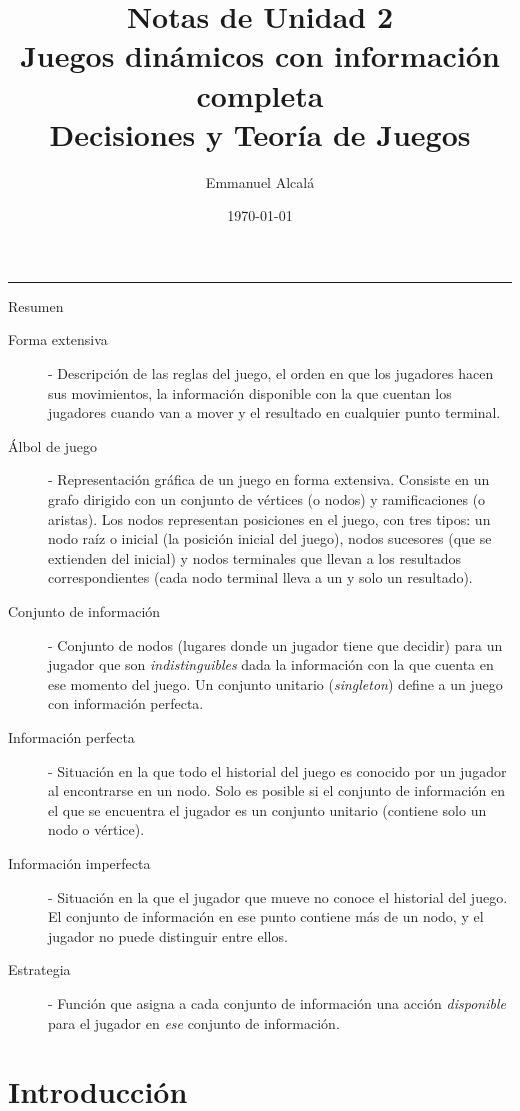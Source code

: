 \documentclass[12pt]{scrartcl}
\title{Notas de Unidad 2\\ \textbf{Juegos dinámicos con información completa}\\ \normalsize Decisiones y Teoría de Juegos}
\author{Emmanuel Alcalá}
\date{\today}
\begin{document}
	
\maketitle

\hrule

\begin{summarybox}{Resumen}
	\begin{description}
		\item[Forma extensiva] - Descripción de las reglas del juego, el orden en que los jugadores hacen sus movimientos, la información disponible con la que cuentan los jugadores cuando van a mover y el resultado en cualquier punto terminal.
		\item[Álbol de juego] - Representación gráfica de un juego en forma extensiva. Consiste en un grafo dirigido con un conjunto de vértices (o nodos) y ramificaciones (o aristas). Los nodos representan posiciones en el juego, con tres tipos: un nodo raíz o inicial (la posición inicial del juego), nodos sucesores (que se extienden del inicial) y nodos terminales que llevan a los resultados correspondientes (cada nodo terminal lleva a un y solo un resultado).
		\item[Conjunto de información] - Conjunto de nodos (lugares donde un jugador tiene que decidir) para un jugador que son \textit{indistinguibles} dada la información con la que cuenta en ese momento del juego. Un conjunto unitario (\textit{singleton}) define a un juego con información perfecta.
		\item[Información perfecta] - Situación en la que todo el historial del juego es conocido por un jugador al encontrarse en un nodo. Solo es posible si el conjunto de información en el que se encuentra el jugador es un conjunto unitario (contiene solo un nodo o vértice).
		\item[Información imperfecta] - Situación en la que el jugador que mueve no conoce el historial del juego. El conjunto de información en ese punto contiene más de un nodo, y el jugador no puede distinguir entre ellos.
		\item[Estrategia] - Función que asigna a cada conjunto de información una acción \textit{disponible} para el jugador en \textit{ese} conjunto de información.
	\end{description}
\end{summarybox}

\section{Introducción}
\end{document}
